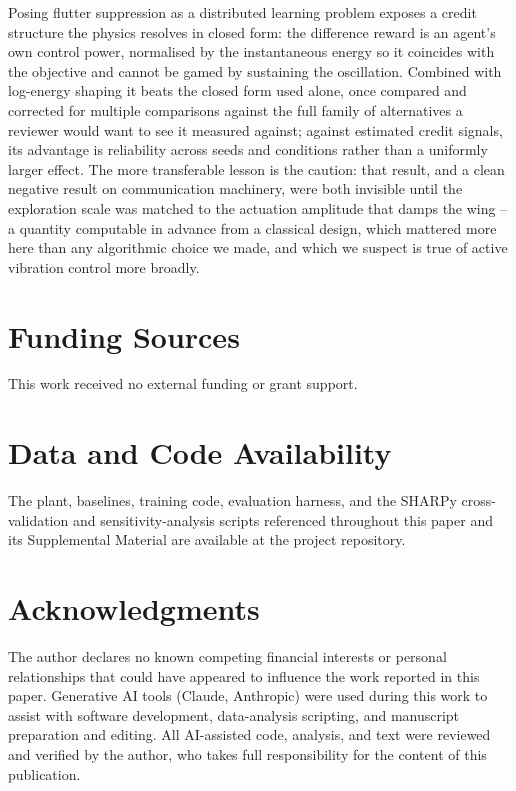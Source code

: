\documentclass[journal]{new-aiaa}
\begin{document}
Posing flutter suppression as a distributed learning problem exposes a
credit structure the physics resolves in closed form: the difference
reward is an agent's own control power, normalised by the instantaneous
energy so it coincides with the objective and cannot be gamed by
sustaining the oscillation. Combined with log-energy shaping it beats the
closed form used alone, once compared and corrected for multiple
comparisons against the full family of alternatives a reviewer would want
to see it measured against; against estimated credit signals, its
advantage is reliability across seeds and conditions rather than a
uniformly larger effect. The more transferable lesson is the caution: that
result, and a clean negative result on communication machinery, were both
invisible until the exploration scale was matched to the actuation
amplitude that damps the wing -- a quantity computable in advance from a
classical design, which mattered more here than any algorithmic choice we
made, and which we suspect is true of active vibration control more
broadly.

\section*{Funding Sources}
This work received no external funding or grant support.

\section*{Data and Code Availability}
The plant, baselines, training code, evaluation harness, and the SHARPy
cross-validation and sensitivity-analysis scripts referenced throughout
this paper and its Supplemental Material are available at the project
repository.

\section*{Acknowledgments}
The author declares no known competing financial interests or personal
relationships that could have appeared to influence the work reported in
this paper. Generative AI tools (Claude, Anthropic) were used during this
work to assist with software development, data-analysis scripting, and
manuscript preparation and editing. All AI-assisted code, analysis, and
text were reviewed and verified by the author, who takes full
responsibility for the content of this publication.


\end{document}
